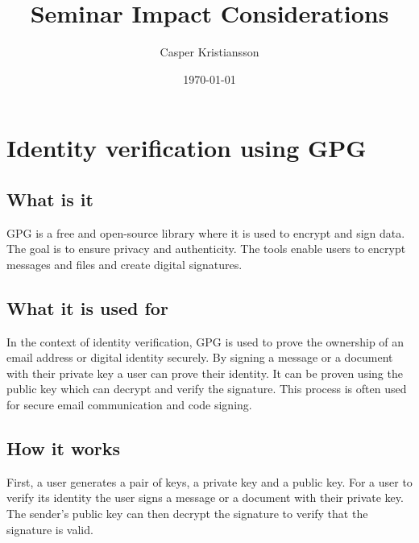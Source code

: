 \documentclass{article}
\title{Seminar Impact Considerations}
\author{Casper Kristiansson}
\date{\today}
\begin{document}
\maketitle

\section{Identity verification using GPG}

\subsection{What is it}
GPG is a free and open-source library where it is used to encrypt and sign data. The goal is to ensure privacy and authenticity. The tools enable users to encrypt messages and files and create digital signatures.

\subsection{What it is used for}
In the context of identity verification, GPG is used to prove the ownership of an email address or digital identity securely. By signing a message or a document with their private key a user can prove their identity. It can be proven using the public key which can decrypt and verify the signature. This process is often used for secure email communication and code signing.

\subsection{How it works}
First, a user generates a pair of keys, a private key and a public key. For a user to verify its identity the user signs a message or a document with their private key. The sender's public key can then decrypt the signature to verify that the signature is valid.


\newpage
\printbibliography
\end{document}
